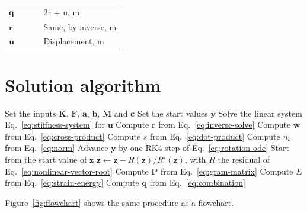\documentclass[11pt,a4paper]{article}
\begin{document}
\noindent\begin{tabular}{@{\quad}l@{\quad}p{0.7\linewidth}@{}}
  $\mathbf{q}$ & 2r + u, \si{m} \\
  $\mathbf{r}$ & Same, by inverse, \si{m} \\
  $\mathbf{u}$ & Displacement, \si{m} \\
\end{tabular}


\section{Solution algorithm}
\begin{algorithm}[htbp]
  \caption{Solution procedure}\label{alg:solution}
  \begin{algorithmic}[1]
    \State Set the inputs $\mathbf{K}$, $\mathbf{F}$, $\mathbf{a}$, $\mathbf{b}$, $\mathbf{M}$ and $\mathbf{c}$
    \State Set the start values $\mathbf{y}$
    \State Solve the linear system Eq.~\eqref{eq:stiffness-system} for $\mathbf{u}$
    \State Compute $\mathbf{r}$ from Eq.~\eqref{eq:inverse-solve}
    \State Compute $\mathbf{w}$ from Eq.~\eqref{eq:cross-product}
    \State Compute $s$ from Eq.~\eqref{eq:dot-product}
    \State Compute $n_a$ from Eq.~\eqref{eq:norm}
     
      \State Advance $\mathbf{y}$ by one RK4 step of Eq.~\eqref{eq:rotation-ode}
    \EndFor
    \State Start from the start value of $\mathbf{z}$
    \Repeat {}
      \State $\mathbf{z} \leftarrow \mathbf{z} - R(\mathbf{z}) / R'(\mathbf{z})$, with $R$ the residual of Eq.~\eqref{eq:nonlinear-vector-root}
    \State Compute $\mathbf{P}$ from Eq.~\eqref{eq:gram-matrix}
    \State Compute $E$ from Eq.~\eqref{eq:strain-energy}
    \State Compute $\mathbf{q}$ from Eq.~\eqref{eq:combination}
  \end{algorithmic}
\end{algorithm}

Figure~\ref{fig:flowchart} shows the same procedure as a flowchart.
\end{document}
